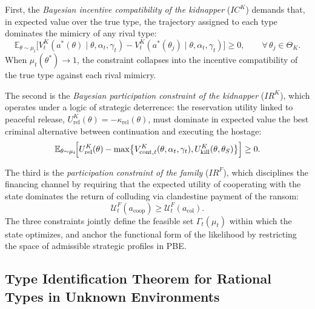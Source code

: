 \documentclass[pdflatex,sn-mathphys-ay]{sn-jnl}
\theoremstyle{plain}
\theoremstyle{definition}
\newcommand{\E}{\mathbb{E}}
\newcommand{\ThetaK}{\Theta_K}
\newcommand{\1}{\mathbf{1}}
\begin{document}
First, the \emph{Bayesian incentive compatibility of the kidnapper} ($IC^K$) demands that, in expected value over the true type, the trajectory assigned to each type dominates the mimicry of any rival type:
\begin{equation}
\E_{\theta\sim\mu_t}\!\bigl[V^K_t(a^\ast(\theta)\mid\theta,\alpha_t,\gamma_t)-V^K_t(a^\ast(\theta_j)\mid\theta,\alpha_t,\gamma_t)\bigr]\ge 0,\qquad\forall\,\theta_j\in\ThetaK.
\label{eq:ic-kidnapper}
\end{equation}
When $\mu_t(\theta^\ast)\to 1$, the constraint collapses into the incentive compatibility of the true type against each rival mimicry.

The second is the \emph{Bayesian participation constraint of the kidnapper} ($IR^K$), which operates under a logic of strategic deterrence: the reservation utility linked to peaceful release, $U^K_{\mathrm{rel}}(\theta)=-\kappa_{\mathrm{rel}}(\theta)$, must dominate in expected value the best criminal alternative between continuation and executing the hostage:
\begin{equation}
\E_{\theta\sim\mu_t}\!\Bigl[U^K_{\mathrm{rel}}(\theta)-\max\bigl\{V^K_{\mathrm{cont},t}(\theta,\alpha_t,\gamma_t),U^K_{\mathrm{kill}}(\theta,\theta_S)\bigr\}\Bigr]\ge 0.
\label{eq:ir-K}
\end{equation}

The third is the \emph{participation constraint of the family} ($IR^F$), which disciplines the financing channel by requiring that the expected utility of cooperating with the state dominates the return of colluding via clandestine payment of the ransom:
\begin{equation}
\mathcal{U}^F_t(a_{\mathrm{coop}})\ge\mathcal{U}^F_t(a_{\mathrm{col}}).
\label{eq:ir-family}
\end{equation}
The three constraints jointly define the feasible set $\Gamma_t(\mu_t)$ within which the state optimizes, and anchor the functional form of the likelihood by restricting the space of admissible strategic profiles in PBE.

\subsection{Type Identification Theorem for Rational Types in Unknown Environments}\label{subsec:formal-defs}
\end{document}
